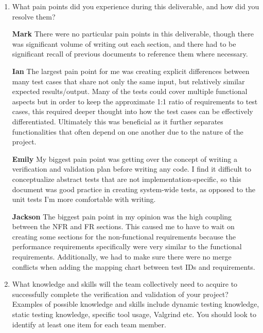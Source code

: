 \documentclass[12pt, titlepage]{article}
\begin{document}
\begin{enumerate}[leftmargin=*]
  \item What pain points did you experience during this deliverable, and how
    did you resolve them?

  \textbf{Mark} There were no particular pain points in this deliverable, though there was significant 
  volume of writing out each section, and there had to be significant recall of previous documents to 
  reference them where necessary.

  \textbf{Ian} The largest pain point for me was creating explicit differences between many test cases 
  that share not only the same input, but relatively similar expected results/output. Many of the tests 
  could cover multiple functional aspects but in order to keep the approximate 1:1 ratio of requirements 
  to test cases, this required deeper thought into how the test cases can be effectively differentiated. 
  Ultimately this was beneficial as it further separates functionalities that often depend on one another 
  due to the nature of the project. 

  \textbf{Emily} My biggest pain point was getting over the concept of writing a verification and 
  validation plan before writing any code. I find it difficult to conceptualize abstract tests that are 
  not implementation-specific, so this document was good practice in creating system-wide tests, as 
  opposed to the unit tests I'm more comfortable with writing.

  \textbf{Jackson} The biggest pain point in my opinion was the high coupling between the NFR and FR sections. 
  This caused me to have to wait on creating some sections for the non-functional requirements because the performance 
  requirements specifically were very similar to the functional requirements. Additionally, we had to make sure there were 
  no merge conflicts when adding the mapping chart between test IDs and requirements.

  \item What knowledge and skills will the team collectively need to acquire to
  successfully complete the verification and validation of your project?
  Examples of possible knowledge and skills include dynamic testing knowledge,
  static testing knowledge, specific tool usage, Valgrind etc.  You should look to
  identify at least one item for each team member. 


\end{enumerate}
\end{document}
